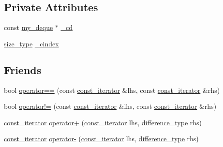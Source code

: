 \subsection*{Private Attributes}
\begin{DoxyCompactItemize}
\item 
const \hyperlink{classmy__deque}{my\-\_\-deque} $\ast$ \hyperlink{classmy__deque_1_1const__iterator_ac136929fce63d854c0266a1c3b050c7b}{\-\_\-cd}
\item 
\hyperlink{classmy__deque_a61e5e5317fe72a381ce4d45f09544b02}{size\-\_\-type} \hyperlink{classmy__deque_1_1const__iterator_aef40061c16eedaed0e048f50a380b67d}{\-\_\-cindex}
\end{DoxyCompactItemize}
\subsection*{Friends}
\begin{DoxyCompactItemize}
\item 
bool \hyperlink{classmy__deque_1_1const__iterator_a772a728ee48f5cb8904aaae842b0eb82}{operator==} (const \hyperlink{classmy__deque_1_1const__iterator}{const\-\_\-iterator} \&lhs, const \hyperlink{classmy__deque_1_1const__iterator}{const\-\_\-iterator} \&rhs)
\item 
bool \hyperlink{classmy__deque_1_1const__iterator_a12d66edf831aeec4957931d7f7945d90}{operator!=} (const \hyperlink{classmy__deque_1_1const__iterator}{const\-\_\-iterator} \&lhs, const \hyperlink{classmy__deque_1_1const__iterator}{const\-\_\-iterator} \&rhs)
\item 
\hyperlink{classmy__deque_1_1const__iterator}{const\-\_\-iterator} \hyperlink{classmy__deque_1_1const__iterator_ab6ce7b11eff6ef34762c30e4e96a86a0}{operator+} (\hyperlink{classmy__deque_1_1const__iterator}{const\-\_\-iterator} lhs, \hyperlink{classmy__deque_1_1const__iterator_abe3b655aa980c8a12ba486058464c91d}{difference\-\_\-type} rhs)
\item 
\hyperlink{classmy__deque_1_1const__iterator}{const\-\_\-iterator} \hyperlink{classmy__deque_1_1const__iterator_a41934331896eac6321161ff28c21fb29}{operator-\/} (\hyperlink{classmy__deque_1_1const__iterator}{const\-\_\-iterator} lhs, \hyperlink{classmy__deque_1_1const__iterator_abe3b655aa980c8a12ba486058464c91d}{difference\-\_\-type} rhs)
\end{DoxyCompactItemize}


